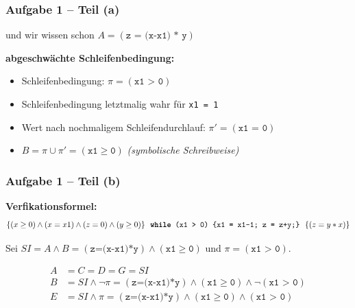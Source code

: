 \documentclass{beamer}
\renewcommand{\emph}[1]{\textbf{#1}}
\begin{document}
\begin{frame} \frametitle{Aufgabe 1 -- Teil (a)}
	 und wir wissen schon $A = (\texttt{z = (x-x1) * y})$
	
	\bigskip
	
	\textbf{abgeschwächte Schleifenbedingung:}
	\begin{itemize}
		\item Schleifenbedingung: $\pi = (\texttt{x1 > 0})$
		\item Schleifenbedingung letztmalig wahr für \texttt{x1 = 1}
		\item Wert nach nochmaligem Schleifendurchlauf: $\pi' = (\texttt{x1 = 0})$
		\item $B = \pi \cup \pi' = (\texttt{x1} \ge \texttt{0})$ \hspace{1cm} {\footnotesize \itshape (symbolische Schreibweise)}
	\end{itemize}
	\medskip
	
\end{frame}


\begin{frame} \frametitle{Aufgabe 1 -- Teil (b)}
	\small
	
	\begin{center}
		\emph{Verfikationsformel:} \tiny
		\begin{equation*}
			\{ (x \ge 0) \land (x = x1) \land (z=0) \land (y \ge 0) \} \ \ \texttt{\emph{while} (x1 > 0) \{x1 = x1-1; z = z+y;\}} \ \ \{(z = y*x)\}
		\end{equation*}
	\end{center}
	
	\bigskip \pause
	
	Sei $SI = A \land B = (\texttt{z=(x-x1)*y}) \land (\texttt{x1} \ge \texttt{0})$ und $\pi = (\texttt{x1 > 0})$.
	
	
	\begin{align*}
		A &= C = D = G = SI \\
		B &= SI \land \lnot \pi = (\texttt{z=(x-x1)*y}) \land (\texttt{x1} \ge \texttt{0}) \land \lnot (\texttt{x1 > 0}) \\
		E &= SI \land \pi = (\texttt{z=(x-x1)*y}) \land (\texttt{x1} \ge \texttt{0}) \land (\texttt{x1 > 0} )
	\end{align*}
\end{frame}
\end{document}
